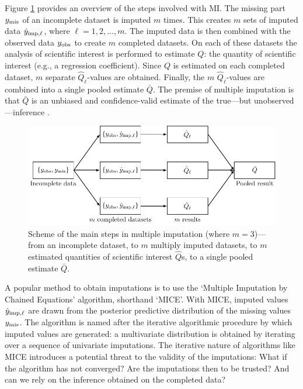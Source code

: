 \documentclass[Royal,times,sageh]{sagej}
\begin{document}
Figure \ref{fig:diagram} provides an overview of the steps involved with MI. The missing part \(y_{\rm mis}\) of an incomplete dataset is imputed \(m\) times. This creates \(m\) sets of imputed data \(\dot y_{\rm imp, \ell}\), where \(\ell = 1, 2, ..., m\). The imputed data is then combined with the observed data \(y_{\rm obs}\) to create \(m\) completed datasets. On each of these datasets the analysis of scientific interest is performed to estimate \(Q\): the quantity of scientific interest (e.g., a regression coefficient). Since \(Q\) is estimated on each completed dataset, \(m\) separate \(\hat{Q}_\ell\)-values are obtained. Finally, the \(m\) \(\hat{Q}_\ell\)-values are combined into a single pooled estimate \(\bar{Q}\). The premise of multiple imputation is that \(\bar{Q}\) is an unbiased and confidence-valid estimate of the true---but unobserved---inference \citep{rubin96}.

\begin{figure}

{\centering \includegraphics[width=\linewidth]{../Figures/DiagramMI} 

}

\caption{Scheme of the main steps in multiple imputation (where $m=3$)---from an incomplete dataset, to $m$ multiply imputed datasets, to $m$ estimated quantities of scientific interest $\hat{Q}$s, to a single pooled estimate $\bar{Q}$.}\label{fig:diagram}
\end{figure}

A popular method to obtain imputations is to use the `Multiple Imputation by Chained Equations' algorithm, shorthand `MICE'\citep{mice}. With MICE, imputed values \(\dot y_{\rm imp, \ell}\) are drawn from the posterior predictive distribution of the missing values \(y_{\rm mis}\). The algorithm is named after the iterative algorithmic procedure by which imputed values are generated: a multivariate distribution is obtained by iterating over a sequence of univariate imputations. The iterative nature of algorithms like MICE introduces a potential threat to the validity of the imputations: What if the algorithm has not converged? Are the imputations then to be trusted? And can we rely on the inference obtained on the completed data?
\end{document}
